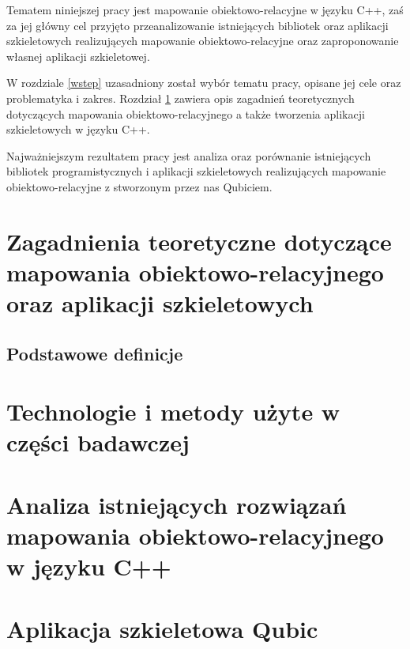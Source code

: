 \documentclass[12pt]{report}
\begin{document}
Tematem niniejszej pracy jest mapowanie obiektowo-relacyjne w języku C++, zaś za jej główny cel przyjęto przeanalizowanie istniejących bibliotek oraz aplikacji szkieletowych
realizujących mapowanie obiektowo-relacyjne oraz zaproponowanie własnej aplikacji szkieletowej.

W rozdziale \ref{wstep} uzasadniony został wybór tematu pracy, opisane jej cele oraz problematyka i zakres. Rozdział \ref{teoria} zawiera opis zagadnień teoretycznych
do\-ty\-czą\-cych mapowania obiektowo-relacyjnego a także tworzenia aplikacji szkieletowych w języku C++.

Najważniejszym rezultatem pracy jest analiza oraz porównanie istniejących bibliotek programistycznych i aplikacji szkieletowych realizujących mapowanie obiekt\-owo-rel\-acyjne
z stworzonym przez nas Qubiciem.

\chapter[Zagadnienia teoretyczne]{Zagadnienia teoretyczne dotyczące mapowania obiektowo-relacyjnego oraz aplikacji szkieletowych} \label{teoria}


\section{Podstawowe definicje} %

\chapter{Technologie i metody użyte w części badawczej} \label{technologie} %

\chapter[Analiza istniejących rozwiązań]{Analiza istniejących rozwiązań mapowania obiektowo-relacyjnego w języku C++} \label{analiza}

\chapter{Aplikacja szkieletowa Qubic} \label{qubic}
\end{document}
